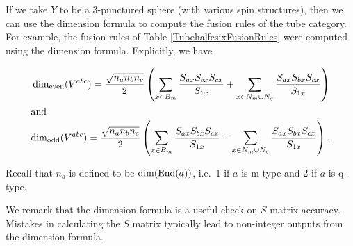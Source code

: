 If we take $Y$ to be a 3-punctured sphere (with various spin structures),
then we can use the dimension formula to compute the fusion rules of the tube category.
For example, the fusion rules of Table \ref{TubehalfesixFusionRules} were computed using
the dimension formula.
Explicitly, we have
\begin{samepage}
\begin{align}
	\dim_{\text{even}}(V^{abc}) = \frac{\sqrt{n_a n_b n_c}}{2}\left(
			\sum_{x\in B_m} \frac{S_{ax}S_{bx}S_{cx}}{S_{1x}} +
			\sum_{x\in N_m \cup N_q} \frac{S_{ax}S_{bx}S_{cx}}{S_{1x}}
	\right)\\
\intertext{and}
	\dim_{\text{odd}}(V^{abc}) = \frac{\sqrt{n_a n_b n_c}}{2}\left(
			\sum_{x\in B_m} \frac{S_{ax}S_{bx}S_{cx}}{S_{1x}} -
			\sum_{x\in N_m \cup N_q} \frac{S_{ax}S_{bx}S_{cx}}{S_{1x}}
	\right) .
\end{align}
\end{samepage}
Recall that $n_a$ is defined to be $\dim(\text{End}(a))$, i.e.\ 1 if $a$ is m-type and 2 if $a$ is q-type.

We remark that the dimension formula is a useful check on $S$-matrix accuracy.
Mistakes in calculating the $S$ matrix typically lead to non-integer outputs from the dimension formula.
